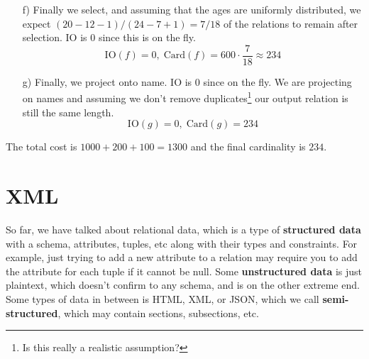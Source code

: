 \documentclass{article}
\begin{document}
\begin{example}
\begin{enumerate}
        \item[f)] Finally we select, and assuming that the ages are uniformly distributed, we expect $(20 - 12 - 1)/ (24 - 7 + 1) = 7/18$ of the relations to remain after selection. IO is $0$ since this is on the fly. 
          \begin{equation}
            \mathrm{IO}(f) = 0, \; \mathrm{Card}(f) = 600 \cdot \frac{7}{18} \approx 234
          \end{equation}

        \item[g)] Finally, we project onto name. IO is $0$ since on the fly. We are projecting on names and assuming we don't remove duplicates\footnote{Is this really a realistic assumption?} our output relation is still the same length. 
          \begin{equation}
            \mathrm{IO}(g) = 0, \; \mathrm{Card}(g) = 234
          \end{equation}
      \end{enumerate}
      The total cost is $1000 + 200 + 100 = 1300$ and the final cardinality is $234$. 
    \end{example}

\section{XML} 

    So far, we have talked about relational data, which is a type of \textbf{structured data} with a schema, attributes, tuples, etc along with their types and constraints. For example, just trying to add a new attribute to a relation may require you to add the attribute for each tuple if it cannot be null. Some \textbf{unstructured data} is just plaintext, which doesn't confirm to any schema, and is on the other extreme end. Some types of data in between is HTML, XML, or JSON, which we call \textbf{semi-structured}, which may contain sections, subsections, etc. 
\end{document}
